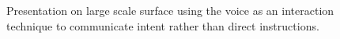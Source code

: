 \documentclass[review,journal]{vgtc}         %
\begin{document}








\begin{figure}[t]
	\centering
	\caption{Presentation on large scale surface using the voice as an interaction technique to communicate intent rather than direct instructions.}
	\label{img:dome_presentation}
\end{figure}
\end{document}
